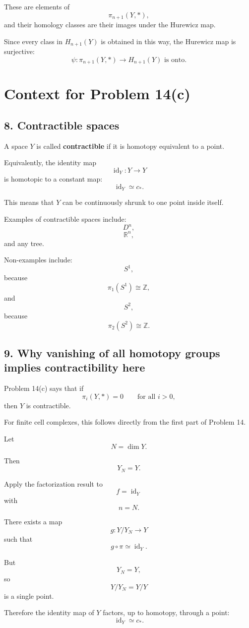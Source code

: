 \documentclass[12pt,a4paper]{article}
\theoremstyle{notespace}
\begin{document}
These are elements of
\[
\pi_{n+1}(Y,*),
\]
and their homology classes are their images under the Hurewicz map.

Since every class in \(H_{n+1}(Y)\) is obtained in this way, the Hurewicz map is surjective:
\[
\boxed{
	\psi:\pi_{n+1}(Y,*)\to H_{n+1}(Y)
	\text{ is onto.}
}
\]

\section*{Context for Problem 14(c)}

\subsection*{8. Contractible spaces}

A space \(Y\) is called \textbf{contractible} if it is homotopy equivalent to a point.

Equivalently, the identity map
\[
\operatorname{id}_Y:Y\to Y
\]
is homotopic to a constant map:
\[
\operatorname{id}_Y\simeq c_*.
\]

This means that \(Y\) can be continuously shrunk to one point inside itself.

Examples of contractible spaces include:
\[
D^n,
\]
\[
\mathbb R^n,
\]
and any tree.

Non-examples include:
\[
S^1,
\]
because
\[
\pi_1(S^1)\cong \mathbb Z,
\]
and
\[
S^2,
\]
because
\[
\pi_2(S^2)\cong \mathbb Z.
\]

\subsection*{9. Why vanishing of all homotopy groups implies contractibility here}

Problem 14(c) says that if
\[
\pi_i(Y,*)=0
\qquad
\text{for all }i>0,
\]
then \(Y\) is contractible.

For finite cell complexes, this follows directly from the first part of Problem 14.

Let
\[
N=\dim Y.
\]

Then
\[
Y_N=Y.
\]

Apply the factorization result to
\[
f=\operatorname{id}_Y
\]
with
\[
n=N.
\]

There exists a map
\[
g:Y/Y_N\to Y
\]
such that
\[
g\circ \pi\simeq \operatorname{id}_Y.
\]

But
\[
Y_N=Y,
\]
so
\[
Y/Y_N=Y/Y
\]
is a single point.

Therefore the identity map of \(Y\) factors, up to homotopy, through a point:
\[
\operatorname{id}_Y\simeq c_*.
\]
\end{document}
